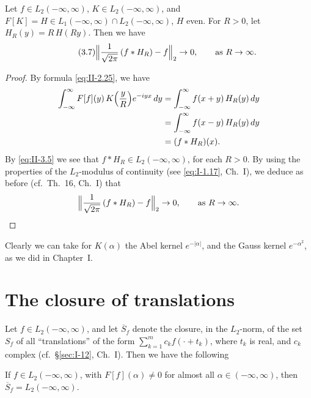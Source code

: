\begin{theorem}\label{thm:II-5}
Let $f\in L_{2}(-\infty,\infty)$, $K\in L_{2}(-\infty,\infty)$, and $F[K]=H\in L_{1}(-\infty,\infty)\cap L_{2}(-\infty,\infty)$, $H$ even. For $R>0$, let $H_{R}(y)=R\,H(Ry)$. Then we have
\begin{equation*}\tag{3.7}\label{eq:II-3.7}
\Bigl\|\frac{1}{\sqrt{2\pi}}\,(f*H_{R})-f\Bigr\|_{2}\to 0,\qquad\text{as }R\to\infty.
\end{equation*}
\end{theorem}
\begin{proof}
By formula \eqref{eq:II-2.25}, we have
\[
\begin{aligned}
\int_{-\infty}^{\infty}F[f](y)\,K\Bigl(\frac{y}{R}\Bigr)e^{-iyx}\,dy &= \int_{-\infty}^{\infty}f(x+y)\,H_{R}(y)\,dy\\
&= \int_{-\infty}^{\infty}f(x-y)\,H_{R}(y)\,dy\\
&= (f*H_{R})(x).
\end{aligned}
\]
By \eqref{eq:II-3.5} we see that $f*H_{R}\in L_{2}(-\infty,\infty)$, for each $R>0$. By using the properties of the $L_{2}$-modulus of continuity (see \eqref{eq:I-1.17}, Ch.~I), we deduce as before (cf.\ Th.~16, Ch.~I) that
\[
\Bigl\|\frac{1}{\sqrt{2\pi}}\,(f*H_{R})-f\Bigr\|_{2}\to 0,\qquad\text{as }R\to\infty.
\]
\end{proof}
\begin{remark}
Clearly we can take for $K(\alpha)$ the Abel kernel $e^{-|\alpha|}$, and the Gauss kernel $e^{-\alpha^{2}}$, as we did in Chapter~I.
\end{remark}

\setcounter{section}{3}
\section{The closure of translations}
\label{sec:II-4}

Let $f\in L_{2}(-\infty,\infty)$, and let $\overline{S}_{f}$ denote the closure, in the $L_{2}$-norm, of the set $S_{f}$ of all ``translations'' of the form $\sum_{k=1}^{m}c_{k}f(\cdot+t_{k})$, where $t_{k}$ is real, and $c_{k}$ complex (cf.\ \S\ref{sec:I-12}, Ch.~I). Then we have the following

\begin{theorem}[Wiener]\label{thm:II-6}
If $f\in L_{2}(-\infty,\infty)$, with $F[f](\alpha)\neq 0$ for almost all $\alpha\in(-\infty,\infty)$, then $\overline{S}_{f}=L_{2}(-\infty,\infty)$.
\end{theorem}

